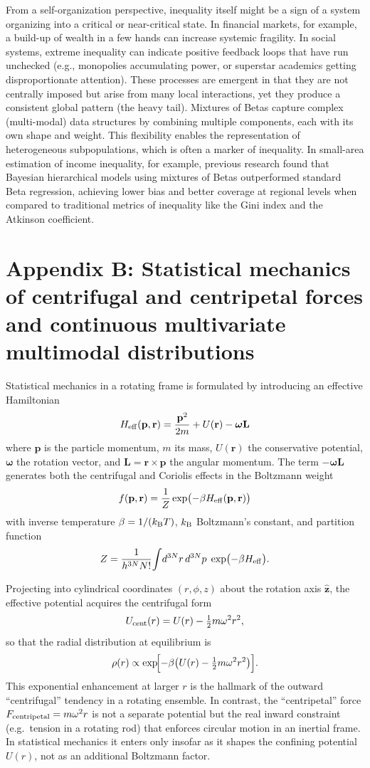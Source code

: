 \documentclass[11pt]{article}
\begin{document}
From a self-organization perspective, inequality itself might be a sign of a system organizing into a critical or near-critical state. In financial markets, for example, a build-up of wealth in a few hands can increase systemic fragility. In social systems, extreme inequality can indicate positive feedback loops that have run unchecked (e.g., monopolies accumulating power, or superstar academics getting disproportionate attention). These processes are emergent in that they are not centrally imposed but arise from many local interactions, yet they produce a consistent global pattern (the heavy tail). Mixtures of Betas capture complex (multi-modal) data structures by combining multiple components, each with its own shape and weight. This flexibility enables the representation of heterogeneous subpopulations, which is often a marker of inequality. In small-area estimation of income inequality, for example, previous research \citep{de2024small} found that Bayesian hierarchical models using mixtures of Betas outperformed standard Beta regression, achieving lower bias and better coverage at regional levels when compared to traditional metrics of inequality like the Gini index and the Atkinson coefficient.

\section{Appendix B: Statistical mechanics of centrifugal and centripetal forces and continuous multivariate multimodal distributions}

Statistical mechanics in a rotating frame is formulated by introducing an effective Hamiltonian 
\[
H_{\rm eff}(\mathbf{p},\mathbf{r}) = \frac{\mathbf{p}^2}{2m} + U(\mathbf{r}) - \boldsymbol{\omega}\mathbf{L}
\]
where \(\mathbf{p}\) is the particle momentum, \(m\) its mass, \(U(\mathbf{r})\) the conservative potential, \(\boldsymbol{\omega}\) the rotation vector, and \(\mathbf{L} = \mathbf{r}\times\mathbf{p}\) the angular momentum.  The term \(-\boldsymbol{\omega}\mathbf{L}\) generates both the centrifugal and Coriolis effects in the Boltzmann weight 
\[
f(\mathbf{p},\mathbf{r}) = \frac{1}{Z}\exp\bigl(-\beta H_{\rm eff}(\mathbf{p},\mathbf{r})\bigr)
\]
with inverse temperature \(\beta=1/(k_{\rm B}T)\), \(k_{\rm B}\) Boltzmann’s constant, and partition function
\[
Z = \frac{1}{h^{3N}N!}\!\int\!d^{3N}r\,d^{3N}p\;\exp\bigl(-\beta H_{\rm eff}\bigr).
\]

Projecting into cylindrical coordinates \((r,\phi,z)\) about the rotation axis \(\hat{\mathbf{z}}\), the effective potential acquires the centrifugal form
\[
U_{\rm cent}(r) = U(r) - \tfrac12m\omega^2 r^2,
\]
so that the radial distribution at equilibrium is
\[
\rho(r)\propto \exp\!\Bigl[-\beta\bigl(U(r)-\tfrac12m\omega^2r^2\bigr)\Bigr].
\]
This exponential enhancement at larger \(r\) is the hallmark of the outward “centrifugal” tendency in a rotating ensemble.  In contrast, the “centripetal” force \(F_{\rm centripetal}=m\omega^2r\) is not a separate potential but the real inward constraint (e.g.\ tension in a rotating rod) that enforces circular motion in an inertial frame.  In statistical mechanics it enters only insofar as it shapes the confining potential \(U(r)\), not as an additional Boltzmann factor.
\end{document}
